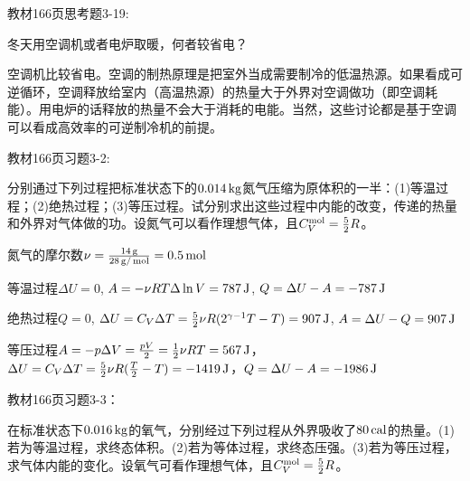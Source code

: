 \documentclass[CJK]{beamer}
\begin{document}
\begin{frame}
  \chtitle{\proid  (\sthree)}
  \bch

  教材166页思考题3-19:
  
  冬天用空调机或者电炉取暖，何者较省电？


  \ech
\end{frame}


\begin{frame}
  \bch
  空调机比较省电。空调的制热原理是把室外当成需要制冷的低温热源。如果看成可逆循环，空调释放给室内（高温热源）的热量大于外界对空调做功（即空调耗能）。用电炉的话释放的热量不会大于消耗的电能。当然，这些讨论都是基于空调可以看成高效率的可逆制冷机的前提。
  \ech
\end{frame}

\begin{frame}
  \chtitle{\proid   (\stwo)}
  \bch
  教材166页习题3-2:

  分别通过下列过程把标准状态下的$0.014\,\mathrm{kg}$氮气压缩为原体积的一半：(1)等温过程；(2)绝热过程；(3)等压过程。试分别求出这些过程中内能的改变，传递的热量和外界对气体做的功。设氮气可以看作理想气体，且$C_V^{\rm mol} = \frac{5}{2}R$。
  
  \ech
\end{frame}


\begin{frame}
  \bch
  {\small
  氮气的摩尔数$\nu = \frac{14\,\mathrm{g}}{28\,\mathrm{g}/\,\mathrm{mol}} = 0.5\,\mathrm{mol}$
  \bitem
\item{等温过程$\Delta U = 0$, $A = -\nu R T\Delta \ln V = 787\,\mathrm{J}$, $Q = \Delta U - A = - 787\,\mathrm{J}$
}
\item{绝热过程$Q=0$, $\Delta U = C_V \Delta T = \frac{5}{2}\nu R (2^{\gamma-1}T -T) = 907\,\mathrm{J}$, $A = \Delta U - Q = 907\,\mathrm{J}$}
\item{等压过程$A = -p\Delta V = \frac{pV}{2} = \frac{1}{2}\nu R T = 567\,\mathrm{J}$，$\Delta U = C_V \Delta T = \frac{5}{2}\nu R (\frac{T}{2}-T) = -1419\,\mathrm{J}$，$Q = \Delta U - A = -1986 \,\mathrm{J}$}
  \eitem
  }
  \ech
\end{frame}

\begin{frame}
  \chtitle{\proid   (\stwo)}
  \bch
  教材166页习题3-3：

  
  在标准状态下$0.016\,\mathrm{kg}$的氧气，分别经过下列过程从外界吸收了$80\,\mathrm{cal}$的热量。(1)若为等温过程，求终态体积。(2)若为等体过程，求终态压强。(3)若为等压过程，求气体内能的变化。设氧气可看作理想气体，且$C_V^{\rm mol} = \frac{5}{2}R$。
  \ech
\end{frame}
\end{document}
